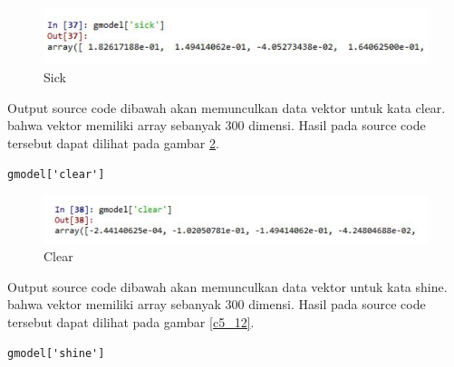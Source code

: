 \begin{enumerate}
\begin{figure}[ht]
	\centerline{\includegraphics[width=1\textwidth]{figures/andi/E4.PNG}}
	\caption{Sick}
	\label{c5_10}
\end{figure}
\subitem Output source code dibawah akan memunculkan data vektor untuk kata clear. bahwa vektor memiliki array sebanyak 300 dimensi. Hasil pada source code tersebut dapat dilihat pada gambar \ref{c5_11}.
\begin{verbatim}
gmodel['clear']
\end{verbatim}
\begin{figure}[ht]
	\centerline{\includegraphics[width=1\textwidth]{figures/andi/E5.PNG}}
	\caption{Clear}
	\label{c5_11}
\end{figure}
\subitem Output source code dibawah akan memunculkan data vektor untuk kata shine. bahwa vektor memiliki array sebanyak 300 dimensi. Hasil pada source code tersebut dapat dilihat pada gambar \ref{c5_12}.
\begin{verbatim}
gmodel['shine']
\end{verbatim}


\end{enumerate}
